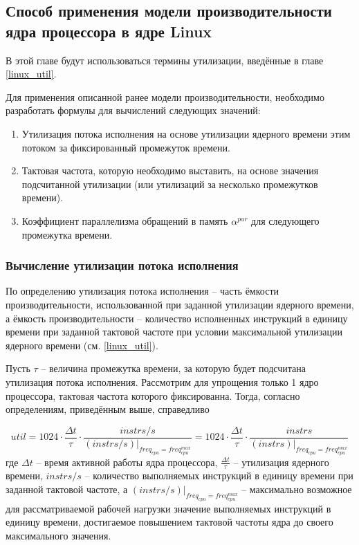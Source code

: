 \subsection{Способ применения модели производительности ядра процессора в ядре Linux}

    В этой главе будут использоваться термины утилизации, введённые в главе \ref{linux_util}.

    Для применения описанной ранее модели производительности, необходимо разработать формулы для
    вычислений следующих значений:
    \begin{enumerate}
        \item Утилизация потока исполнения на основе утилизации ядерного времени этим потоком за
        фиксированный промежуток времени.
        \item Тактовая частота, которую необходимо выставить, на основе значения подсчитанной
        утилизации (или утилизаций за несколько промежутков времени).
        \item Коэффициент параллелизма обращений в память $\alpha^{par}$ для следующего промежутка
        времени.
    \end{enumerate}

\subsubsection{Вычисление утилизации потока исполнения}

    По определению утилизация потока исполнения -- часть ёмкости производительности,
    использованной при заданной утилизации ядерного времени, а
    ёмкость производительности -- количество исполненных инструкций в единицу времени при заданной
    тактовой частоте при условии максимальной утилизации ядерного времени (см. \ref{linux_util}).

    Пусть $\tau$ -- величина промежутка времени, за которую будет подсчитана утилизация потока исполнения.
    Рассмотрим для упрощения только 1 ядро процессора, тактовая частота которого фиксированна.
    Тогда, согласно определениям, приведённым выше, справедливо

    \begin{equation}
        util = 1024 \cdot \frac{\Delta t}{\tau} \cdot \frac{instrs / s}{(instrs / s) |_{freq_{cpu} = freq_{cpu}^{max}}} =
            1024 \cdot \frac{\Delta t}{\tau} \cdot \frac{instrs}{(instrs) |_{freq_{cpu} = freq_{cpu}^{max}}}
    \end{equation}
    где $\Delta t$ -- время активной работы ядра процессора, $\frac{\Delta t}{\tau}$ -- утилизация ядерного
    времени, $instrs / s$ -- количество выполняемых инструкций в единицу времени при заданной тактовой
    частоте, а $(instrs / s) |_{freq_{cpu} = freq_{cpu}^{max}}$ -- максимально возможное для
    рассматриваемой рабочей нагрузки значение выполняемых инструкций в единицу времени, достигаемое
    повышением тактовой частоты ядра до своего максимального значения.

